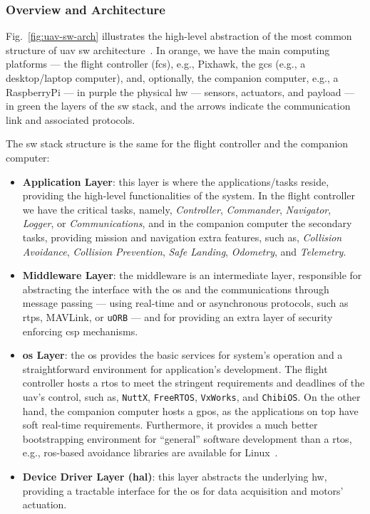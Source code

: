 \subsubsection{Overview and Architecture}%
\label{sec:overv-arch-sw}
Fig.~\ref{fig:uav-sw-arch} illustrates the high-level abstraction of the
most common structure of \gls{uav} \gls{sw} architecture~\cite{leccadito2018survey,px4-sysArch}. In orange, we have the main computing
platforms --- the flight controller (\gls{fcs}), e.g., Pixhawk, the \gls{gcs}
(e.g., a desktop/laptop computer), and,
optionally, the companion computer, e.g., a RaspberryPi --- in purple the
physical \gls{hw} --- sensors, actuators, and payload --- in green the
layers of the \gls{sw} stack, and the arrows indicate the communication link and
associated protocols.

The \gls{sw} stack structure is the same for the
flight controller and the companion computer:
\begin{itemize}
\item \textbf{Application Layer}: this layer is where the applications/tasks
  reside, providing the high-level functionalities of the system. In the flight
  controller we have the critical tasks, namely,
  \emph{Controller}, \emph{Commander}, \emph{Navigator}, \emph{Logger},
  or \emph{Communications}, and in the companion computer the secondary tasks,
  providing mission and navigation extra features, such as, \emph{Collision
    Avoidance}, \emph{Collision Prevention}, \emph{Safe Landing},
  \emph{Odometry}, and \emph{Telemetry}.
%
\item \textbf{Middleware Layer}: the middleware is an intermediate layer,
  responsible for abstracting the interface with the \gls{os} and the
  communications through message passing --- using real-time and or asynchronous
  protocols, such as \gls{rtps}, MAVLink, or \texttt{uORB} --- and for providing
  an extra layer of security enforcing \gls{csp} mechanisms.
%
\item \textbf{\gls{os} Layer}: the \gls{os} provides the basic services for
  system's operation and a straightforward environment for application's
  development. The flight controller hosts a \gls{rtos} to meet the stringent
  requirements and deadlines of the \gls{uav}'s control, such as,
  \texttt{NuttX}, \texttt{FreeRTOS}, \texttt{VxWorks}, and \texttt{ChibiOS}. On
  the other hand, the companion computer hosts a \gls{gpos}, as the applications
  on top have soft real-time requirements. Furthermore, it provides a much
  better bootstrapping environment for ``general'' software development than a
  \gls{rtos}, e.g., \gls{ros}-based avoidance libraries are available for Linux~\cite{px4-sysArch}.
%
\item \textbf{Device Driver Layer (\gls{hal})}: this layer abstracts the
  underlying \gls{hw}, providing a tractable interface for the \gls{os} for data
  acquisition and motors' actuation.
\end{itemize}

